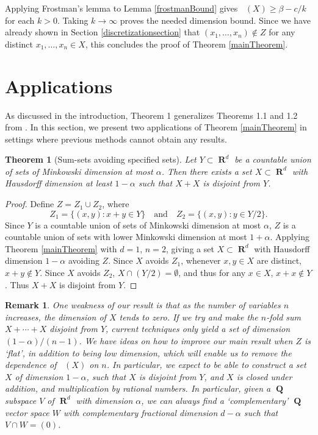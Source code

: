 \documentclass[dvipsnames,letterpaper,12pt]{article}
\numberwithin{equation}{section}
\theoremstyle{plain}
\newtheorem{theorem}{Theorem}
\newtheorem*{remark}{Remark}
\DeclareMathOperator{\hausdim}{\dim_{\mathbf{H}}}
\DeclareMathOperator{\RR}{\mathbf{R}}
\DeclareMathOperator{\QQ}{\mathbf{Q}}
\begin{document}
Applying Frostman's lemma to Lemma \ref{frostmanBound} gives $\hausdim(X) \geq \beta - c/k$ for each $k > 0$. Taking $k \to \infty$ proves the needed dimension bound. Since we have already shown in Section \ref{discretizationsection} that $(x_1, \dots, x_n) \not \in Z$ for any distinct $x_1, \dots, x_n \in X$, this concludes the proof of Theorem \ref{mainTheorem}.









\section{Applications}\label{applications}

As discussed in the introduction, Theorem 1 generalizes Theorems 1.1 and 1.2 from \cite{MalabikaRob}. In this section, we present two applications of Theorem \ref{mainTheorem} in settings where previous methods cannot obtain any results.

\begin{theorem}[Sum-sets avoiding specified sets]
	Let $Y \subset \RR^d$ be a countable union of sets of Minkowski dimension at most $\alpha$. Then there exists a set $X \subset \RR^d$ with Hausdorff dimension at least $1 - \alpha$ such that $X + X$ is disjoint from $Y$.
\end{theorem}
\begin{proof}
	Define $Z = Z_1 \cup Z_2$, where
	\[ Z_1 = \{ (x,y) : x + y \in Y \} \quad \text{and} \quad Z_2 = \{ (x,y): y \in Y/2 \}. \]
	Since $Y$ is a countable union of sets of Minkowski dimension at most $\alpha$, $Z$ is a countable union of sets with lower Minkowski dimension at most $1 + \alpha$. Applying Theorem \ref{mainTheorem} with $d = 1$, $n = 2$, giving a set $X \subset \RR^d$ with Hausdorff dimension $1 - \alpha$ avoiding $Z$. Since $X$ avoids $Z_1$, whenever $x,y \in X$ are distinct, $x + y \not \in Y$. Since $X$ avoids $Z_2$, $X \cap (Y/2) = \emptyset$, and thus for any $x \in X$, $x + x \not \in Y$. Thus $X + X$ is disjoint from $Y$.
\end{proof}

\begin{remark}
	One weakness of our result is that as the number of variables $n$ increases, the dimension of $X$ tends to zero. If we try and make the $n$-fold sum $X + \cdots + X$ disjoint from $Y$, current techniques only yield a set of dimension $(1 - \alpha)/(n-1)$. We have ideas on how to improve our main result when $Z$ is `flat', in addition to being low dimension, which will enable us to remove the dependence of $\hausdim(X)$ on $n$. In particular, we expect to be able to construct a set $X$ of dimension $1 - \alpha$, such that $X$ is disjoint from $Y$, and $X$ is closed under addition, and multiplication by rational numbers. In particular, given a $\QQ$ subspace $V$ of $\RR^d$ with dimension $\alpha$, we can always find a `complementary' $\QQ$ vector space $W$ with complementary fractional dimension $d - \alpha$ such that $V \cap W = (0)$.
\end{remark}
\end{document}
